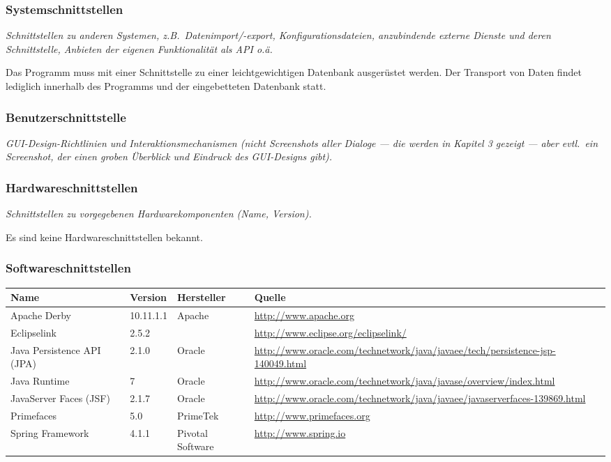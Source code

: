 \documentclass[fontsize=12pt,paper=a4,twoside]{scrartcl}
\begin{document}
  
\subsubsection{Systemschnittstellen}

  {\em Schnittstellen zu anderen Systemen, z.B.\ Datenimport/-export,
  Konfigurationsdateien, anzubindende externe Dienste und deren Schnittstelle,
  Anbieten der eigenen Funktionalität als API o.ä.}


Das Programm muss mit einer Schnittstelle zu einer leichtgewichtigen Datenbank ausgerüstet werden. Der Transport von Daten findet lediglich innerhalb des Programms und der eingebetteten Datenbank statt.
  

\subsubsection{Benutzerschnittstelle}


  {\em GUI-Design-Richtlinien und Interaktionsmechanismen (nicht
  Screenshots aller Dialoge --- die werden in Kapitel 3 gezeigt --- aber
  evtl.\ ein Screenshot, der einen groben Überblick und Eindruck des
  GUI-Designs gibt).}



\subsubsection{Hardwareschnittstellen}


  {\em Schnittstellen zu vorgegebenen Hardwarekomponenten (Name,
  Version).}

Es sind keine Hardwareschnittstellen bekannt.
 

\subsubsection{Softwareschnittstellen}

  \begin{tabularx}{\textwidth}{|p{3cm}|p{1.5cm}|p{3cm}|X|}\hline
    \textbf{Name} & \textbf{Version} & \textbf{Hersteller} & \textbf{Quelle} \\\hline
    Apache Derby & 10.11.1.1 & Apache & \url{http://www.apache.org} \\\hline
    Eclipselink & 2.5.2 & & \url{http://www.eclipse.org/eclipselink/} \\\hline
    Java Persistence API (JPA) & 2.1.0 & Oracle & \url{http://www.oracle.com/technetwork/java/javaee/tech/persistence-jsp-140049.html} \\\hline 
    Java Runtime & 7 & Oracle & \url{http://www.oracle.com/technetwork/java/javase/overview/index.html} \\\hline
    JavaServer Faces (JSF) & 2.1.7 & Oracle & \url{http://www.oracle.com/technetwork/java/javaee/javaserverfaces-139869.html} \\\hline
    Primefaces & 5.0 & PrimeTek &  \url{http://www.primefaces.org}\\\hline
    Spring Framework & 4.1.1 & Pivotal Software & \url{http://www.spring.io}\\\hline  \end{tabularx}
\end{document}
